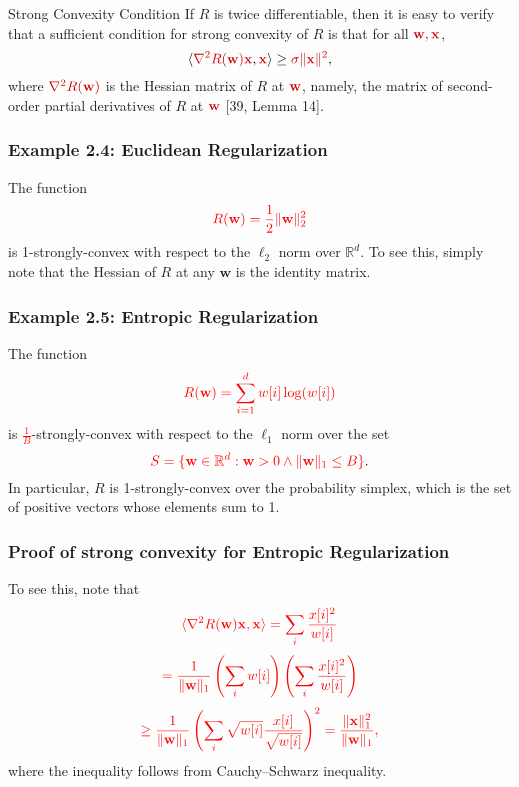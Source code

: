 \documentclass[handout]{beamer}
\newcommand{\redmath}[1]{\textcolor{mathred}{#1}}
\begin{document}
\begin{frame}{Strong Convexity Condition}
    If \( R \) is twice differentiable, then it is easy to verify that a sufficient condition for strong convexity of \( R \) is that for all \( \redmath{\mathbf{w}, \mathbf{x}} \),
    \[
    \langle \redmath{\nabla^2 R(\mathbf{w}) \mathbf{x}}, \redmath{\mathbf{x}} \rangle \geq \redmath{\sigma \|\mathbf{x}\|^2},
    \]
    where \( \redmath{\nabla^2 R(\mathbf{w})} \) is the Hessian matrix of \( R \) at \( \redmath{\mathbf{w}} \), namely, the matrix of second-order partial derivatives of \( R \) at \( \redmath{\mathbf{w}} \) [39, Lemma 14].
\end{frame}


\begin{frame}
    \frametitle{Example 2.4: Euclidean Regularization}
    The function 
    \[
    \textcolor{red}{R(\mathbf{w}) = \frac{1}{2} \|\mathbf{w}\|_2^2}
    \]
    is 1-strongly-convex with respect to the $\ell_2$ norm over $\mathbb{R}^d$. To see this, simply note that the Hessian of $R$ at any $\mathbf{w}$ is the identity matrix.
\end{frame}

\begin{frame}
    \frametitle{Example 2.5: Entropic Regularization}
    The function 
    \[
    \textcolor{red}{R(\mathbf{w}) = \sum_{i=1}^{d} w[i] \log(w[i])}
    \]
    is \textcolor{red}{$\frac{1}{B}$}-strongly-convex with respect to the $\ell_1$ norm over the set 
    \[
    \textcolor{red}{S = \{\mathbf{w} \in \mathbb{R}^d : \mathbf{w} > 0 \wedge \|\mathbf{w}\|_1 \leq B\}}.
    \]
    In particular, $R$ is 1-strongly-convex over the probability simplex, which is the set of positive vectors whose elements sum to 1.
\end{frame}

\begin{frame}
    \frametitle{Proof of strong convexity for Entropic Regularization}
    To see this, note that 
    \[
    \textcolor{red}{\langle \nabla^2 R(\mathbf{w})\mathbf{x},\mathbf{x} \rangle = \sum_i \frac{x[i]^2}{w[i]}}
    \]
    \[
    \textcolor{red}{= \frac{1}{\|\mathbf{w}\|_1} \left(\sum_i w[i] \right) \left(\sum_i \frac{x[i]^2}{w[i]} \right)}
    \]
    \[
    \textcolor{red}{\geq \frac{1}{\|\mathbf{w}\|_1} \left(\sum_i \sqrt{w[i]} \frac{x[i]}{\sqrt{w[i]}} \right)^2 = \frac{\|\mathbf{x}\|_1^2}{\|\mathbf{w}\|_1},}
    \]
    where the inequality follows from Cauchy–Schwarz inequality.
\end{frame}
\end{document}
